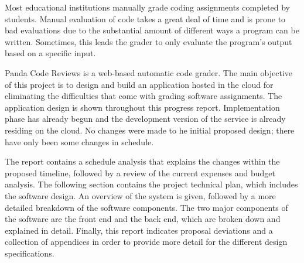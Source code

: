 
Most educational institutions manually grade coding assignments completed by
students. Manual evaluation of code takes a great deal of time and is prone to
bad evaluations due to the substantial amount of different ways a program can be
written. Sometimes, this leads the grader to only evaluate the program's output
based on a specific input.

Panda Code Reviews is a web-based automatic code grader. The main objective of
this project is to design and build an application hosted in the cloud for
eliminating the difficulties that come with grading software assignments. The
application design is shown throughout this progress report. Implementation
phase has already begun and the development version of the service is already
residing on the cloud. No changes were made to he initial proposed design; there
have only been some changes in schedule.

The report contains a schedule analysis that explains the changes within the
proposed timeline, followed by a review of the current expenses and budget
analysis. The following section contains the project technical plan, which
includes the software design. An overview of the system is given, followed by a
more detailed breakdown of the software components. The two major components of
the software are the front end and the back end, which are broken down and
explained in detail. Finally, this report indicates proposal deviations and a
collection of appendices in order to provide more detail for the different
design specifications.
